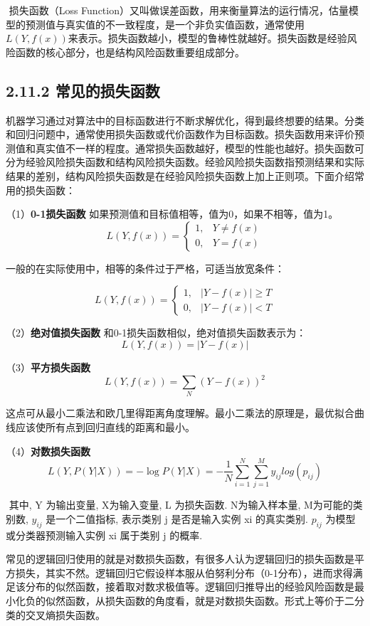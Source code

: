 ​ 损失函数（Loss
Function）又叫做误差函数，用来衡量算法的运行情况，估量模型的预测值与真实值的不一致程度，是一个非负实值函数，通常使用$
L(Y,
f(x))​$来表示。损失函数越小，模型的鲁棒性就越好。损失函数是经验风险函数的核心部分，也是结构风险函数重要组成部分。

\subsection{2.11.2
常见的损失函数}\label{ux5e38ux89c1ux7684ux635fux5931ux51fdux6570}

​
机器学习通过对算法中的目标函数进行不断求解优化，得到最终想要的结果。分类和回归问题中，通常使用损失函数或代价函数作为目标函数。
​
损失函数用来评价预测值和真实值不一样的程度。通常损失函数越好，模型的性能也越好。
​
损失函数可分为经验风险损失函数和结构风险损失函数。经验风险损失函数指预测结果和实际结果的差别，结构风险损失函数是在经验风险损失函数上加上正则项。
​ 下面介绍常用的损失函数：

（1）\textbf{0-1损失函数}
如果预测值和目标值相等，值为0，如果不相等，值为1。 \[
L(Y, f(x)) =
\begin{cases}
1,& Y\ne f(x)\\
0,& Y = f(x)
\end{cases}
\]

一般的在实际使用中，相等的条件过于严格，可适当放宽条件：

\[
L(Y, f(x)) =
\begin{cases}
1,& |Y-f(x)|\geqslant T\\
0,& |Y-f(x)|< T
\end{cases}
\]

（2）\textbf{绝对值损失函数} 和0-1损失函数相似，绝对值损失函数表示为：
\[
L(Y, f(x)) = |Y-f(x)|​
\]

（3）\textbf{平方损失函数} \[
L(Y, f(x)) = \sum_N{(Y-f(x))}^2
\]

这点可从最小二乘法和欧几里得距离角度理解。最小二乘法的原理是，最优拟合曲线应该使所有点到回归直线的距离和最小。

（4）\textbf{对数损失函数} \[
L(Y, P(Y|X)) = -\log{P(Y|X)}=-\frac{1}{N}\sum_{i=1}^N\sum_{j=1}^M y_{ij}log(p_{ij})
\]

​ 其中, Y 为输出变量, X为输入变量, L 为损失函数. N为输入样本量,
M为可能的类别数, $y_{ij}$ 是一个二值指标, 表示类别 j 是否是输入实例 xi
的真实类别. $p_{ij}$ 为模型或分类器预测输入实例 xi 属于类别 j 的概率.

常见的逻辑回归使用的就是对数损失函数，有很多人认为逻辑回归的损失函数是平方损失，其实不然。逻辑回归它假设样本服从伯努利分布（0-1分布），进而求得满足该分布的似然函数，接着取对数求极值等。逻辑回归推导出的经验风险函数是最小化负的似然函数，从损失函数的角度看，就是对数损失函数。形式上等价于二分类的交叉熵损失函数。

